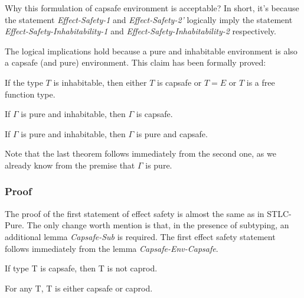 Why this formulation of capsafe environment is acceptable? In short,
it's because the statement \emph{Effect-Safety-1} and
\emph{Effect-Safety-2'} logically imply the statement
\emph{Effect-Safety-Inhabitability-1} and
\emph{Effect-Safety-Inhabitability-2} respectively.

The logical implications hold because a pure and inhabitable
environment is also a capsafe (and pure) environment. This claim has
been formally proved:

\begin{lemma}
  If the type $T$ is inhabitable, then either $T$ is capsafe or
  $T = E$ or $T$ is a free function type.
\end{lemma}

\begin{theorem}
  If $\Gamma$ is pure and inhabitable, then $\Gamma$ is capsafe.
\end{theorem}

\begin{corollary}
  If $\Gamma$ is pure and inhabitable, then $\Gamma$ is pure and
  capsafe.
\end{corollary}

Note that the last theorem follows immediately from the second one, as
we already know from the premise that $\Gamma$ is pure.


\subsubsection{Proof}

The proof of the first statement of effect safety is almost the same
as in STLC-Pure. The only change worth mention is that, in the
presence of subtyping, an additional lemma \emph{Capsafe-Sub} is
required.  The first effect safety statement follows immediately from
the lemma \emph{Capsafe-Env-Capsafe}.

\begin{lemma}
 If type T is capsafe, then T is not caprod.
\end{lemma}

\begin{lemma}
 For any T, T is either capsafe or caprod.
\end{lemma}

